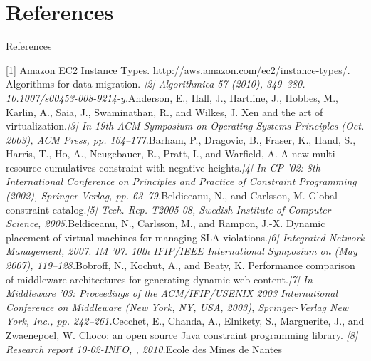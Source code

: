\section{References} 
\begin{frame}[allowframebreaks]{References}

\begin{thebibliography}{2}

{ 
\small
\beamertemplatearticlebibitems {} [1] Amazon EC2 Instance Types. \newblock\emph \newblock http://aws.amazon.com/ec2/instance-types/.
\beamertemplatearticlebibitems {} Algorithms for data migration. \newblock\emph{[2]  Algorithmica 57 (2010), 349–380. 10.1007/s00453-008-9214-y.}\newblock Anderson, E., Hall, J., Hartline, J., Hobbes, M., Karlin, A., Saia, J., Swaminathan, R., and Wilkes, J.
\beamertemplatearticlebibitems {} Xen and the art of virtualization.\newblock\emph{[3]   In 19th ACM Symposium on Operating Systems Principles (Oct. 2003), ACM Press, pp. 164–177.}\newblock Barham, P., Dragovic, B., Fraser, K., Hand, S., Harris, T., Ho, A., Neugebauer, R., Pratt, I., and Warfield, A.
\beamertemplatearticlebibitems {} A new multi-resource cumulatives constraint with negative heights.\newblock\emph{[4]  In CP ’02: 8th International Conference on Principles and Practice of Constraint Programming (2002), Springer-Verlag, pp. 63–79.}\newblock Beldiceanu, N., and Carlsson, M. 
\beamertemplatearticlebibitems {} Global constraint catalog.\newblock\emph{[5]  Tech. Rep. T2005-08, Swedish Institute of Computer Science, 2005.}\newblock Beldiceanu, N., Carlsson, M., and Rampon, J.-X. 
\beamertemplatearticlebibitems {} Dynamic placement of virtual machines for managing SLA violations.\newblock\emph{[6]  Integrated Network Management, 2007. IM ’07. 10th IFIP/IEEE International Symposium on (May 2007), 119–128.}\newblock Bobroff, N., Kochut, A., and Beaty, K. 
\beamertemplatearticlebibitems {} Performance comparison of middleware architectures for generating dynamic web content.\newblock\emph{[7]  In Middleware ’03: Proceedings of the ACM/IFIP/USENIX 2003 International Conference on Middleware (New York, NY, USA, 2003), Springer-Verlag New York, Inc., pp. 242–261.}\newblock Cecchet, E., Chanda, A., Elnikety, S., Marguerite, J., and Zwaenepoel, W. 
\beamertemplatearticlebibitems {} Choco: an open source Java constraint programming library. \newblock\emph{[8] Research report 10-02-INFO, , 2010.}\newblock Ecole des Mines de Nantes
}
\end{thebibliography}
\end{frame}
